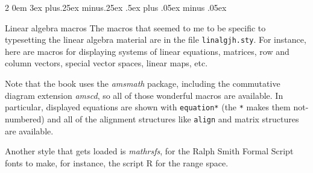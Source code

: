 \documentclass[titlepage]{article}
\makeatletter
\renewcommand{\subsection}{\@startsection{subsection}%
  {2}%
  {0em}%
  {3ex plus.25ex minus.25ex}%
  {.5ex plus .05ex minus .05ex}%
  {\bfseries\raggedright}}
\makeatother
\begin{document}
\subsection{Linear algebra macros}
The macros that seemed to me to be specific to typesetting the
linear algebra material are in the file 
\texttt{linalgjh.sty}.
For instance, here are macros for displaying systems of linear equations,
matrices, row and column vectors, special vector spaces, linear maps,
etc.

Note that the book uses the \textit{amsmath} package, 
including the commutative diagram extension \textit{amscd},
so all of those
wonderful macros are available.
In particular, displayed equations are shown with 
\verb|equation*| (the \texttt{*} makes them not-numbered) and all of the 
alignment structures like \verb|align| and matrix structures 
are available.

Another style that gets loaded is \textit{mathrsfs}, for the 
Ralph Smith Formal Script fonts to make, for instance, the script R
for the range space.
\end{document}
